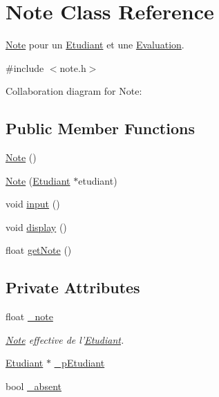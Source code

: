 \hypertarget{class_note}{\section{Note Class Reference}
\label{class_note}
}


\hyperlink{class_note}{Note} pour un \hyperlink{class_etudiant}{Etudiant} et une \hyperlink{class_evaluation}{Evaluation}.  




{\ttfamily \#include $<$note.\-h$>$}



Collaboration diagram for Note\-:
\subsection*{Public Member Functions}
\begin{DoxyCompactItemize}
\item 
\hyperlink{class_note_a11dfaf68eb7a094b121add4adb18620e}{Note} ()
\item 
\hyperlink{class_note_a286e19b1d1b478314b0ec48d27675472}{Note} (\hyperlink{class_etudiant}{Etudiant} $\ast$etudiant)
\item 
void \hyperlink{class_note_a60e3344a645763b9bac160249e202206}{input} ()
\item 
void \hyperlink{class_note_aa2e4741a587cc0f44127e722e3dd6d6f}{display} ()
\item 
float \hyperlink{class_note_a2360b36c3e33284e9d9d19331659c631}{get\-Note} ()
\end{DoxyCompactItemize}
\subsection*{Private Attributes}
\begin{DoxyCompactItemize}
\item 
float \hyperlink{class_note_a2c1f6f0948a0d8e1cbfc9a2ce3271a8f}{\-\_\-note}
\begin{DoxyCompactList}\small\item\em \hyperlink{class_note}{Note} effective de l'\hyperlink{class_etudiant}{Etudiant}. \end{DoxyCompactList}\item 
\hyperlink{class_etudiant}{Etudiant} $\ast$ \hyperlink{class_note_a664da26e6bfdfd67a40f7d4a97c9364c}{\-\_\-p\-Etudiant}
\item 
bool \hyperlink{class_note_a5d6599721a364a7486e3056b87eb0b25}{\-\_\-absent}
\end{DoxyCompactItemize}


